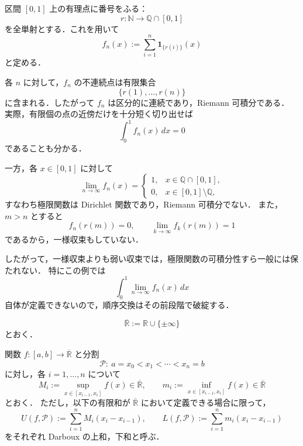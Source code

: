 \begin{example}
区間 $[0,1]$ 上の有理点に番号をふる：
\[
r:\mathbb N\to \mathbb Q\cap[0,1]
\]
を全単射とする．これを用いて
\[
f_n(x):=\sum_{i=1}^n \mathbf 1_{\{r(i)\}}(x)
\]
と定める．

各 $n$ に対して，$f_n$ の不連続点は有限集合
\[
\{r(1),\dots,r(n)\}
\]
に含まれる．したがって $f_n$ は区分的に連続であり，Riemann 可積分である．
実際，有限個の点の近傍だけを十分短く切り出せば
\[
\int_0^1 f_n(x)\,dx=0
\]
であることも分かる．

一方，各 $x\in[0,1]$ に対して
\[
\lim_{n\to\infty}f_n(x)=
\begin{cases}
1, & x\in \mathbb Q\cap[0,1],\\[1mm]
0, & x\in [0,1]\setminus\mathbb Q,
\end{cases}
\]
すなわち極限関数は Dirichlet 関数であり，Riemann 可積分でない．
また，$m>n$ とすると
\[
f_n(r(m))=0,\qquad \lim_{k\to\infty} f_k(r(m))=1
\]
であるから，一様収束もしていない．

したがって，一様収束よりも弱い収束では，極限関数の可積分性すら一般には保たれない．
特にこの例では
\[
\int_0^1 \lim_{n\to\infty} f_n(x)\,dx
\]
自体が定義できないので，順序交換はその前段階で破綻する．
\end{example}







\begin{definition}[拡張実数]
\[
\overline{\mathbb R}:=\mathbb R\cup\{\pm\infty\}
\]
とおく．
\end{definition}

\begin{definition}
関数 $f:[a,b]\to\overline{\mathbb R}$ と分割
\[
\mathcal P:\ a=x_0<x_1<\cdots<x_n=b
\]
に対し，各 $i=1,\dots,n$ について
\[
M_i:=\sup_{x\in[x_{i-1},x_i]} f(x)\in\overline{\mathbb R},
\qquad
m_i:=\inf_{x\in[x_{i-1},x_i]} f(x)\in\overline{\mathbb R}
\]
とおく．
ただし，以下の有限和が $\overline{\mathbb R}$ において定義できる場合に限って，
\[
U(f,\mathcal P):=\sum_{i=1}^n M_i(x_i-x_{i-1}),
\qquad
L(f,\mathcal P):=\sum_{i=1}^n m_i(x_i-x_{i-1})
\]
をそれぞれ Darboux の上和，下和と呼ぶ．
\end{definition}

